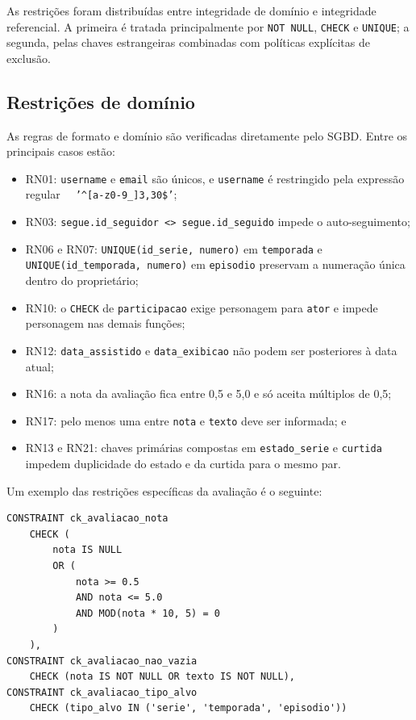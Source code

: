 \documentclass[a4paper,12pt,oneside,openany]{book}
\newcommand{\id}[1]{\texttt{#1}}
\begin{document}
As restrições foram distribuídas entre integridade de domínio e integridade
referencial. A primeira é tratada principalmente por \id{NOT NULL}, \id{CHECK}
e \id{UNIQUE}; a segunda, pelas chaves estrangeiras combinadas com políticas
explícitas de exclusão.

\subsection*{Restrições de domínio}

As regras de formato e domínio são verificadas diretamente pelo SGBD. Entre os
principais casos estão:

\begin{itemize}[nosep]
    \item RN01: \id{username} e \id{email} são únicos, e \id{username} é
    restringido pela expressão regular \id{\string~ '^[a-z0-9\_]{3,30}\$'};
    \item RN03: \id{segue.id\_seguidor <> segue.id\_seguido} impede o
    auto-seguimento;
    \item RN06 e RN07: \id{UNIQUE(id\_serie, numero)} em \id{temporada} e
    \id{UNIQUE(id\_temporada, numero)} em \id{episodio} preservam a numeração
    única dentro do proprietário;
    \item RN10: o \id{CHECK} de \id{participacao} exige personagem para
    \id{ator} e impede personagem nas demais funções;
    \item RN12: \id{data\_assistido} e \id{data\_exibicao} não podem ser
    posteriores à data atual;
    \item RN16: a nota da avaliação fica entre 0,5 e 5,0 e só aceita múltiplos
    de 0,5;
    \item RN17: pelo menos uma entre \id{nota} e \id{texto} deve ser
    informada; e
    \item RN13 e RN21: chaves primárias compostas em \id{estado\_serie} e
    \id{curtida} impedem duplicidade do estado e da curtida para o mesmo par.
\end{itemize}

Um exemplo das restrições específicas da avaliação é o seguinte:

\begin{lstlisting}[caption={Restrições de domínio de \id{avaliacao}},label={lst:restricoes-avaliacao}]
CONSTRAINT ck_avaliacao_nota
    CHECK (
        nota IS NULL
        OR (
            nota >= 0.5
            AND nota <= 5.0
            AND MOD(nota * 10, 5) = 0
        )
    ),
CONSTRAINT ck_avaliacao_nao_vazia
    CHECK (nota IS NOT NULL OR texto IS NOT NULL),
CONSTRAINT ck_avaliacao_tipo_alvo
    CHECK (tipo_alvo IN ('serie', 'temporada', 'episodio'))
\end{lstlisting}
\end{document}
